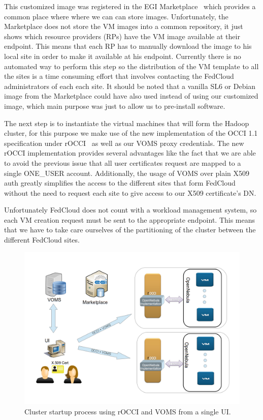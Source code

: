 \documentclass[oribibl]{llncs_Ibergrid2013}
\begin{document}
This customized image was registered in the EGI Marketplace~\cite{marketplace} which provides a common place where where we can can store images. Unfortunately, the Marketplace does not store the VM images into a common repository, it just shows which resource providers (RPs) have the VM image available at their endpoint. This means that each RP has to manually download the image to his local site in order to make it available at his endpoint. Currently there is no automated way to perform this step so the distribution of the VM template to all the sites is a time consuming effort that involves contacting the FedCloud administrators of each each site. It should be noted that a vanilla SL6 or Debian image from the Marketplace could have also used instead of using our customized image, which main purpose was just to allow us to pre-install software.


The next step is to instantiate the virtual machines that will form the Hadoop cluster, for this purpose we make use of the new implementation of the OCCI 1.1 specification under rOCCI~\cite{rocci} as well as our VOMS proxy credentials. The new rOCCI implementation provides several advantages like the fact that we are able to avoid the previous issue that all user certificates request are mapped to a single ONE\_USER account.
Additionally, the usage of VOMS over plain X509 auth greatly simplifies the access to the different sites that form FedCloud without the need to request each site to give access to our X509 certificate's DN.

Unfortunately FedCloud does not count with a workload management system, so each VM creation request must be sent to the appropriate endpoint. This means that we have to take care ourselves of the partitioning of the cluster between the different FedCloud sites.


\begin{figure}[h]
\centering
\includegraphics[width=\textwidth]{figures/client-v2.png}
\caption{Cluster startup process using rOCCI and VOMS from a single UI.}
\label{fig:client}
\end{figure}
\end{document}
